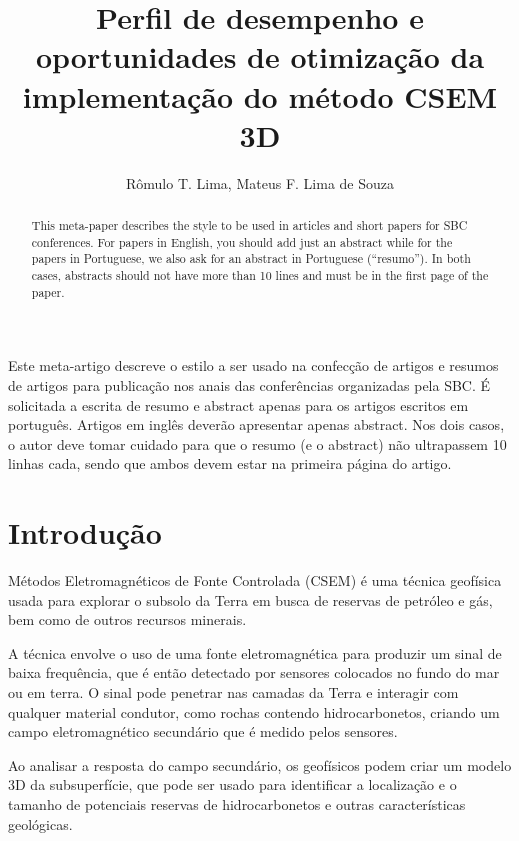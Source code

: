 \documentclass[12pt]{article}
\title{Perfil de desempenho e oportunidades de otimização da implementação do método CSEM 3D}
\author{Rômulo T. Lima\inst{1,2}, Mateus F. Lima de Souza\inst{1,3}}
\begin{document}
 

\maketitle

\begin{abstract}
  This meta-paper describes the style to be used in articles and short papers
  for SBC conferences. For papers in English, you should add just an abstract
  while for the papers in Portuguese, we also ask for an abstract in
  Portuguese (``resumo''). In both cases, abstracts should not have more than
  10 lines and must be in the first page of the paper.
\end{abstract}
     
\begin{resumo} 
  Este meta-artigo descreve o estilo a ser usado na confecção de artigos e
  resumos de artigos para publicação nos anais das conferências organizadas
  pela SBC. É solicitada a escrita de resumo e abstract apenas para os artigos
  escritos em português. Artigos em inglês deverão apresentar apenas abstract.
  Nos dois casos, o autor deve tomar cuidado para que o resumo (e o abstract)
  não ultrapassem 10 linhas cada, sendo que ambos devem estar na primeira
  página do artigo.
\end{resumo}


\section{Introdução}

Métodos Eletromagnéticos de Fonte Controlada (CSEM) é uma técnica geofísica usada para explorar o subsolo da Terra em busca de reservas de petróleo e gás, bem como de outros recursos minerais.

A técnica envolve o uso de uma fonte eletromagnética para produzir um sinal de baixa frequência, que é então detectado por sensores colocados no fundo do mar ou em terra. O sinal pode penetrar nas camadas da Terra e interagir com qualquer material condutor, como rochas contendo hidrocarbonetos, criando um campo eletromagnético secundário que é medido pelos sensores.

Ao analisar a resposta do campo secundário, os geofísicos podem criar um modelo 3D da subsuperfície, que pode ser usado para identificar a localização e o tamanho de potenciais reservas de hidrocarbonetos e outras características geológicas.
\end{document}
